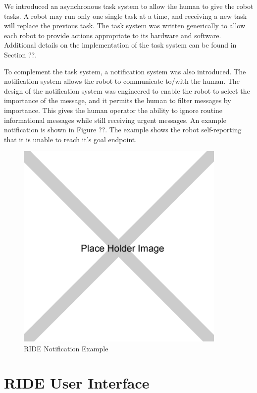 We introduced an asynchronous task system to allow the human to give the robot tasks. A robot may run only one single task at a time, and receiving a new task will replace the previous task. The task system was written generically to allow each robot to provide actions appropriate to its hardware and software. Additional details on the implementation of the task system can be found in Section ??.

To complement the task system, a notification system was also introduced. The notification system allows the robot to communicate to/with the human. The design of the notification system was engineered to enable the robot to select the importance of the message, and it permits the human to filter messages by importance. This gives the human operator the ability to ignore routine informational messages while still receiving urgent messages. An example notification is shown in Figure ??. The example shows the robot self-reporting that it is unable to reach it’s goal endpoint.

\begin{figure}[ht]
\begin{center}
\includegraphics[width=4.0in]{images/placeholder.png}
\caption{RIDE Notification Example\label{fig:ride-notification}}
\end{center}
\end{figure}

\section{RIDE User Interface}

